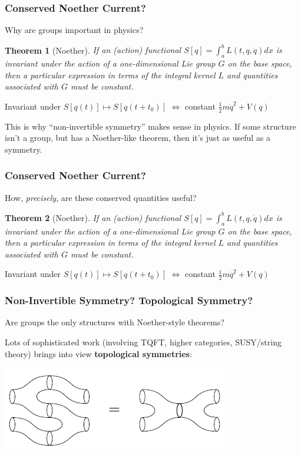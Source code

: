 \documentclass[10pt]{beamer}
\newtheorem{thm}{Theorem}
\begin{document}
\begin{frame}
  \frametitle{Conserved Noether Current?}
  Why are groups important in physics?
  \begin{thm}[Noether]
    If an (action) functional $S[q] = \int_{a}^{b}L(t, q, \dot{q})dx$ is invariant under the action of
    a one-dimensional Lie group $G$ on the base space,
    then a particular expression in terms of the integral kernel $L$ and quantities associated with $G$ must be constant.
  \end{thm}

  Invariant under $S[q(t)] \mapsto S[q(t + t_{0})]$ $\Leftrightarrow$ constant $\frac{1}{2}m\dot{q}^{2} + V(q)$

  This is why ``non-invertible symmetry'' makes sense in physics.
  If some structure isn't a group, but has a Noether-like theorem, then it's just as useful as a symmetry.
\end{frame}

\begin{frame}
  \frametitle{Conserved Noether Current?}
  How, \textit{precisely}, are these conserved quantities useful?
  \begin{thm}[Noether]
    If an (action) functional $S[q] = \int_{a}^{b}L(t, q, \dot{q})dx$ is invariant under the action of
    a one-dimensional Lie group $G$ on the base space,
    then a particular expression in terms of the integral kernel $L$ and quantities associated with $G$ must be constant.
  \end{thm}

  Invariant under $S[q(t)] \mapsto S[q(t + t_{0})]$ $\Leftrightarrow$ constant $\frac{1}{2}m\dot{q}^{2} + V(q)$
\end{frame}



\begin{frame}
  \frametitle{Non-Invertible Symmetry? Topological Symmetry?}
  Are groups the only structures with Noether-style theorems?

  Lots of sophisticated work (involving TQFT, higher categories, SUSY/string theory) brings into view \textbf{topological symmetries}:
  \begin{center}
    \includegraphics[scale=0.5]{tqft.png}
  \end{center}

\end{frame}
\end{document}
